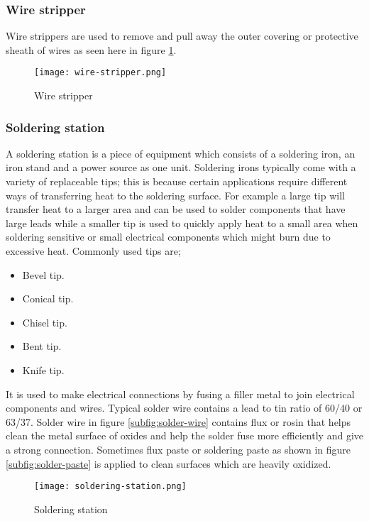 \documentclass[a4paper,12pt]{article}
\begin{document}
				\subsubsection*{Wire stripper}
					Wire strippers are used to remove and pull away the outer covering or protective sheath of wires as seen here in figure \ref{fig:wire-stripper}.
						\begin{figure}[H]
							\centering				
							\texttt{[image: wire-stripper.png]}
							\caption{Wire stripper}
							\label{fig:wire-stripper}
						\end{figure}
				
				\subsubsection*{Soldering station}
					A soldering station is a piece of equipment which consists of a soldering iron, an iron stand and a power source as one unit.
					Soldering irons typically come with a variety of replaceable tips; this is because certain applications require different ways of transferring heat to the soldering surface.
					For example a large tip will transfer heat to a larger area and can be used to solder components that have large leads while a smaller tip is used to quickly apply heat to a small area  when soldering sensitive or small electrical components which might burn due to excessive heat.
					Commonly used tips are;
					\begin{itemize}
						\item Bevel tip.
						\item Conical tip.
						\item Chisel tip.
						\item Bent tip.
						\item Knife tip.					
					\end{itemize}					   
					It is used to make electrical connections by fusing a filler metal to join electrical components and wires.
					Typical solder wire contains a lead to tin ratio of 60/40 or 63/37.
					Solder wire in figure \ref{subfig:solder-wire} contains flux or rosin that helps clean the metal surface of oxides and help the solder fuse more efficiently and give a strong connection.
					Sometimes flux paste or soldering paste as shown in figure \ref{subfig:solder-paste} is applied to clean surfaces which are heavily oxidized.
					
					 
					
					  
						\begin{figure}[H]
							\centering				
								\texttt{[image: soldering-station.png]}
							\caption{Soldering station}
							\label{fig:soldering-station}
						\end{figure}						
												
\end{document}
